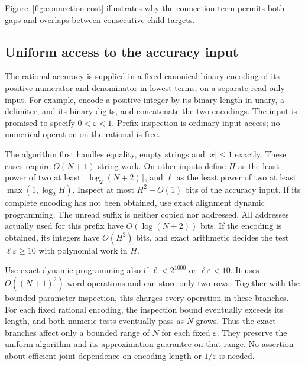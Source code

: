 Figure~\ref{fig:connection-cost} illustrates why the connection term permits
both gaps and overlaps between consecutive child targets.


\subsection{Uniform access to the accuracy input}
The rational accuracy is supplied in a fixed canonical binary encoding of
its positive numerator and denominator in lowest terms, on a separate
read-only input.
For example, encode a positive integer by its binary length in unary,
a delimiter, and its binary digits, and concatenate the two encodings.
The input is promised to specify $0<\varepsilon<1$. Prefix inspection is
ordinary input access; no numerical operation on the rational is free.

The algorithm first handles equality, empty strings and $|x|\le1$
exactly. These cases require $O(N+1)$ string work. On other inputs define
$H$ as the least power of two at least $\lceil\log_2(N+2)\rceil$, and
$\ell$ as the least power of two at least $\max(1,\log_2 H)$.
Inspect at most $H^2+O(1)$ bits of the accuracy input. If its complete
encoding has not been obtained, use exact alignment dynamic programming.
The unread suffix is neither copied nor addressed. All addresses actually
used for this prefix have $O(\log(N+2))$ bits. If the encoding is obtained,
its integers have $O(H^2)$ bits, and exact arithmetic decides the test
$\ell\varepsilon\ge10$ with polynomial work in $H$.

Use exact dynamic programming also if $\ell<2^{1000}$ or
$\ell\varepsilon<10$. It uses $O((N+1)^2)$ word operations and can store
only two rows. Together with the bounded parameter inspection, this
charges every operation in these branches. For each fixed rational
encoding, the inspection bound eventually exceeds its length, and both
numeric tests eventually pass as $N$ grows. Thus the exact branches affect
only a bounded range of $N$ for each fixed $\varepsilon$. They preserve
the uniform algorithm and its approximation guarantee on that range.
No assertion about efficient joint dependence on encoding length or
$1/\varepsilon$ is needed.

